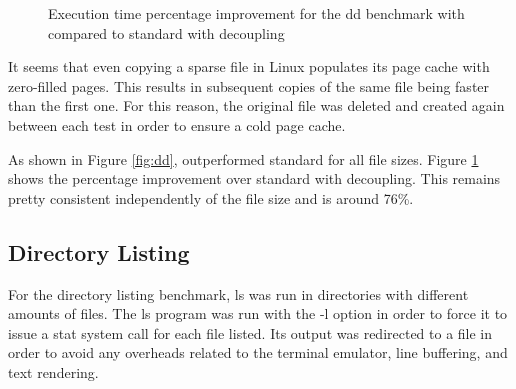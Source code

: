
\newcommand{\Ka}{72.3}
\newcommand{\Kb}{76.6}
\newcommand{\Kc}{76.4}
\newcommand{\Kd}{75.4}
\newcommand{\Ke}{76.3}

\begin{figure}[h!]
\caption{Execution time percentage improvement for the dd benchmark with
  \memsc compared to standard \llinux with decoupling}
\label{fig:dd_improvement}
\end{figure}

\break

It seems that even copying a sparse file in Linux populates its page cache with
zero-filled pages. This results in subsequent copies of the same file being
faster than the first one. For this reason, the original file was deleted and
created again between each test in order to ensure a cold page cache.

As shown in Figure \ref{fig:dd}, \memsc outperformed standard \llinux for all
file sizes. Figure \ref{fig:dd_improvement} shows the percentage improvement
over standard \llinux with decoupling. This remains pretty consistent
independently of the file size and is around 76\%.

\subsection{Directory Listing}

For the directory listing benchmark, ls was run in directories with different
amounts of files. The ls program was run with the -l option in order to force
it to issue a stat system call for each file listed. Its output was redirected
to a file in order to avoid any overheads related to the terminal emulator,
line buffering, and text rendering.

